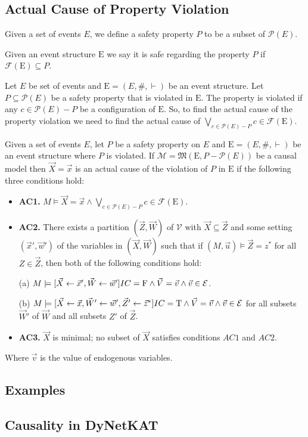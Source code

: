 \subsection{Actual Cause of Property Violation}
\begin{definition}
    Given a set of events $E$, we define a safety property $P$ to be a
    subset of $\mathcal{P}(E)$.
\end{definition}
\begin{definition}
    Given an event structure $\mathrm{E}$ we say it is safe regarding the 
    property $P$ if $\mathcal{F}(\mathrm{E}) \subseteq P$.
\end{definition}
Let $E$ be set of events and $\mathrm{E} = (E,\#,\vdash)$ be an event structure.
Let $P \subseteq \mathcal{P}(E)$ be a safety property that is violated in 
$\mathrm{E}$.
The property is violated if any $c \in \mathcal{P}(E) - P$ be a configuration
of $\mathrm{E}$. 
So, to find the actual cause of the property violation we need to find 
the actual cause of 
$\bigvee_{c \in \mathcal{P}(E) - P}c \in \mathcal{F}(\mathrm{E})$.
\begin{definition}
    Given a set of events $E$, let $P$ be a safety property on $E$ and 
    $\mathrm{E} = (E,\#,\vdash)$ be an event structure where $P$ is violated.
    If $\mathcal{M} = \mathfrak{M}(\mathrm{E}, P - \mathcal{P}(E))$
    be a causal model then $\vec X = \vec x$ is
    an actual cause of the violation of $P$ in $\mathrm{E}$ if the
    following three conditions hold:
    \begin{itemize}
        \item  \textbf{AC1.} $M\models \vec X = \vec x
                  \wedge \bigvee_{c \in \mathcal{P}(E) - P}c \in \mathcal{F}(\mathrm{E})$.
        \item  \textbf{AC2. }There exists a partition $(\vec Z, \vec W)$ of $\mathcal{V}$ with $\vec X \subseteq \vec Z$ and some setting $(\vec x',\vec w')$ of the variables in $(\vec X,\vec W)$ such that if $(M,\vec u)\models \vec Z = z^*$ for all $Z\in \vec Z$, then both of the following conditions hold:

              (a) $M \models[\vec X \leftarrow \vec x', \vec W \leftarrow \vec w']
                  IC = \mathrm{F}
                  \wedge \vec V = \vec v
                  \wedge  \vec v \in \mathcal{E}$.

              (b) $M \models[\vec X\leftarrow \vec x, \vec W' \leftarrow \vec w', \vec Z'\leftarrow \vec z^*]
                  IC = \mathrm{T}
                  \wedge \vec V = \vec v
                  \wedge \vec v \in \mathcal{E}$
              for all subsets $\vec W'$ of $\vec W$ and all subsets $Z'$ of $\vec Z$.

        \item  \textbf{AC3.} $\vec X$ is minimal; no subset of $\vec X$ satisfies conditions $AC1$ and $AC2$.
    \end{itemize}
    Where $\vec v$ is the value of endogenous variables.
\end{definition}
\pagebreak


\subsection{Examples}


\subsection{Causality in DyNetKAT}

